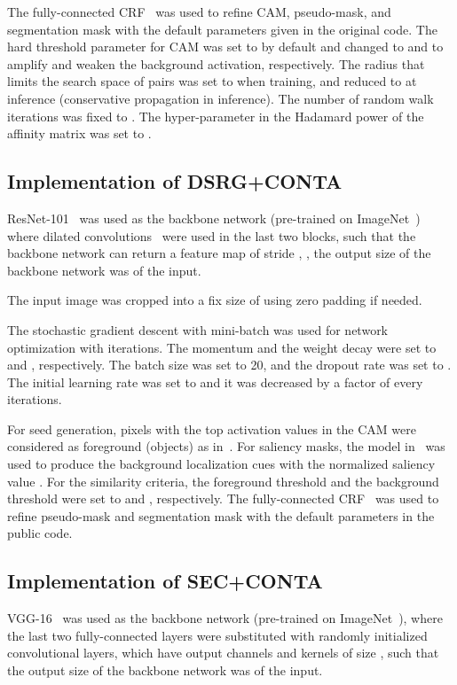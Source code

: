  The fully-connected CRF~\cite{krahenbuhl2011efficient} was used to refine CAM, pseudo-mask, and segmentation mask with the default parameters given in the original code. The hard threshold parameter for CAM was set to  by default and changed to  and  to amplify and weaken the background activation, respectively. The radius  that limits the search space of pairs was set to  when training, and reduced to  at inference (conservative propagation in inference).
The number of random walk iterations  was fixed to . The hyper-parameter  in the Hadamard power of the affinity matrix was set to .

\subsection{Implementation of DSRG+CONTA}
 ResNet-101~\cite{he2016deep} was used as the backbone network (pre-trained on ImageNet~\cite{deng2009imagenet}) where dilated convolutions~\cite{yu2015multi} were used in the last two blocks, such that the backbone network can return a feature map of stride , \ie, the output size of the backbone network was  of the input.

 The input image was cropped into a fix size of  using zero padding if needed.

 The stochastic gradient descent with mini-batch was used for network optimization with  iterations. The momentum and the weight decay were set to  and , respectively. The batch size was set to 20, and the dropout rate was set to . The initial learning rate was set to  and it was decreased by a factor of  every  iterations.

 For seed generation, pixels with the top  activation values in the CAM were considered as foreground (objects) as in~\cite{zhou2016learning}. For saliency masks, the model in~\cite{jiang2013salient} was used to produce the background localization cues with the normalized saliency value . For the similarity criteria, the foreground threshold and the background threshold were set to  and , respectively. The fully-connected CRF~\cite{krahenbuhl2011efficient} was used to refine pseudo-mask and segmentation mask with the default parameters in the public code.

\subsection{Implementation of SEC+CONTA}
 VGG-16~\cite{simonyan2014very} was used as the backbone network (pre-trained on ImageNet~\cite{deng2009imagenet}), where the last two fully-connected layers were substituted with randomly initialized convolutional layers, which have  output channels and kernels of size , such that the output size of the backbone network was  of the input.

